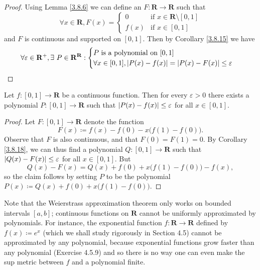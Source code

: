 \begin{proof}
    Using Lemma \ref{3.8.6} we can define an \(F : \mathbf{R} \to \mathbf{R}\) such that
    \[
        \forall x \in \mathbf{R}, F(x) = \begin{cases}
            0    & \text{if } x \in \mathbf{R} \setminus [0, 1] \\
            f(x) & \text{if } x \in [0, 1]
        \end{cases}
    \]
    and \(F\) is continuous and supported on \([0, 1]\).
    Then by Corollary \ref{3.8.15} we have
    \[
        \forall \varepsilon \in \mathbf{R}^+, \exists\ P \in \mathbf{R}^{\mathbf{R}} : \begin{cases}
            P \text{ is a polynomial on } [0, 1] \\
            \forall x \in [0, 1], \abs*{P(x) - f(x)} = \abs*{P(x) - F(x)} \leq \varepsilon
        \end{cases}
    \]
\end{proof}

\begin{corollary}\label{3.8.19}
    Let \(f : [0, 1] \to \mathbf{R}\) be a continuous function.
    Then for every \(\varepsilon > 0\) there exists a polynomial \(P : [0, 1] \to \mathbf{R}\) such that \(\abs*{P(x) - f(x)} \leq \varepsilon\) for all \(x \in [0, 1]\).
\end{corollary}

\begin{proof}
    Let \(F : [0, 1] \to \mathbf{R}\) denote the function
    \[
        F(x) \coloneqq f(x) - f(0) - x \big(f(1) - f(0)\big).
    \]
    Observe that \(F\) is also continuous, and that \(F(0) = F(1) = 0\).
    By Corollary \ref{3.8.18}, we can thus find a polynomial \(Q : [0, 1] \to \mathbf{R}\) such that \(\abs*{Q(x) - F(x)} \leq \varepsilon\) for all \(x \in [0, 1]\).
    But
    \[
        Q(x) - F(x) = Q(x) + f(0) + x \big(f(1) - f(0)\big) - f(x),
    \]
    so the claim follows by setting \(P\) to be the polynomial \(P(x) \coloneqq Q(x) + f(0) + x \big(f(1) - f(0)\big)\).
\end{proof}

\begin{remark}\label{3.8.20}
    Note that the Weierstrass approximation theorem only works on bounded intervals \([a, b]\);
    continuous functions on \(\mathbf{R}\) cannot be uniformly approximated by polynomials.
    For instance, the exponential function \(f : \mathbf{R} \to \mathbf{R}\) defined by \(f(x) \coloneqq e^x\) (which we shall study rigorously in Section 4.5) cannot be approximated by any polynomial, because exponential functions grow faster than any polynomial (Exercise 4.5.9) and so there is no way one can even make the sup metric between \(f\) and a polynomial finite.
\end{remark}

